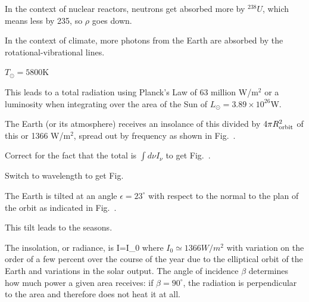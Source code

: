 \documentclass[11pt]{book}
\begin{document}
\bee
\item
In the context of nuclear reactors, neutrons get absorbed more by $^{238}U$, which means less by 235, so $\rho$ goes down.
\item In the context of climate, more photons from the Earth are absorbed by the rotational-vibrational lines.
\eee




\bei
\item $T_\odot=5800$K
\item This leads to a total radiation using Planck's Law of 63 million W/m$^2$ or a luminosity when integrating over the area of the Sun of $L_\odot=3.89\times 10^{26}$W.
\item The Earth (or its atmosphere) receives an insolance of this divided by $4\pi R_{\rm orbit}^2$ of this or 1366 W/m$^2$, spread out by frequency as shown in Fig.~.
\item Correct for the fact that the total is $\int d\nu I_\nu$ to get Fig.~.
\item Switch to wavelength to get Fig.~
\eei





\bei
\item The Earth is tilted at an angle $\epsilon=23^\circ$ with respect to the normal to the plan of the orbit as indicated in Fig.~.
\item This tilt leads to the seasons.
\item The insolation, or radiance, is
\be
I=I_0\cos\beta
\ee
where $I_0\simeq 1366 W/m^2$ with variation on the order of a few percent over the course of the year due to the elliptical orbit of the Earth and variations in the solar output. The angle of incidence $\beta$ determines how much power a given area receives: if $\beta=90^\circ$, the radiation is perpendicular to the area and therefore does not heat it at all. 
\end{document}
